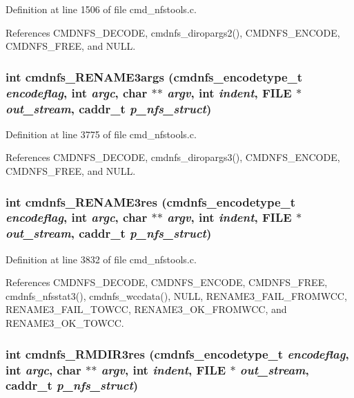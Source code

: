 Definition at line 1506 of file cmd\_\-nfstools.c.

References CMDNFS\_\-DECODE, cmdnfs\_\-diropargs2(), CMDNFS\_\-ENCODE, CMDNFS\_\-FREE, and NULL.
\subsubsection{\setlength{\rightskip}{0pt plus 5cm}int cmdnfs\_\-RENAME3args ({\bf cmdnfs\_\-encodetype\_\-t} {\em encodeflag}, int {\em argc}, char $\ast$$\ast$ {\em argv}, int {\em indent}, FILE $\ast$ {\em out\_\-stream}, caddr\_\-t {\em p\_\-nfs\_\-struct})}\label{cmd__nfstools_8h_a58}




Definition at line 3775 of file cmd\_\-nfstools.c.

References CMDNFS\_\-DECODE, cmdnfs\_\-diropargs3(), CMDNFS\_\-ENCODE, CMDNFS\_\-FREE, and NULL.
\subsubsection{\setlength{\rightskip}{0pt plus 5cm}int cmdnfs\_\-RENAME3res ({\bf cmdnfs\_\-encodetype\_\-t} {\em encodeflag}, int {\em argc}, char $\ast$$\ast$ {\em argv}, int {\em indent}, FILE $\ast$ {\em out\_\-stream}, caddr\_\-t {\em p\_\-nfs\_\-struct})}\label{cmd__nfstools_8h_a59}




Definition at line 3832 of file cmd\_\-nfstools.c.

References CMDNFS\_\-DECODE, CMDNFS\_\-ENCODE, CMDNFS\_\-FREE, cmdnfs\_\-nfsstat3(), cmdnfs\_\-wccdata(), NULL, RENAME3\_\-FAIL\_\-FROMWCC, RENAME3\_\-FAIL\_\-TOWCC, RENAME3\_\-OK\_\-FROMWCC, and RENAME3\_\-OK\_\-TOWCC.
\subsubsection{\setlength{\rightskip}{0pt plus 5cm}int cmdnfs\_\-RMDIR3res ({\bf cmdnfs\_\-encodetype\_\-t} {\em encodeflag}, int {\em argc}, char $\ast$$\ast$ {\em argv}, int {\em indent}, FILE $\ast$ {\em out\_\-stream}, caddr\_\-t {\em p\_\-nfs\_\-struct})}\label{cmd__nfstools_8h_a55}




